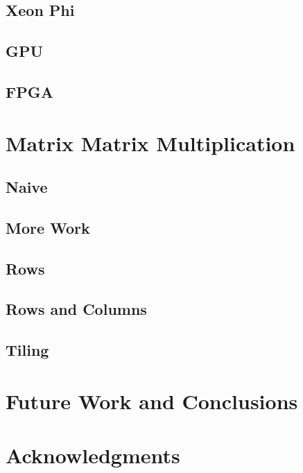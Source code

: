 \documentclass[fleqn,10pt,onecolumn]{ipcc} %
\begin{document}
\subsection{Xeon Phi}

\subsection{GPU}

\subsection{FPGA}

\section{Matrix Matrix Multiplication}

\subsection{Naive}
\label{sec:naive}

\subsection{More Work}
\label{sec:moreWork}

\subsection{Rows}
\label{sec:rows}

\subsection{Rows and Columns}
\label{sec:rowscols}

\subsection{Tiling}
\label{sec:tiling}

\section{Future Work and Conclusions}

\section*{Acknowledgments} %

\end{document}
